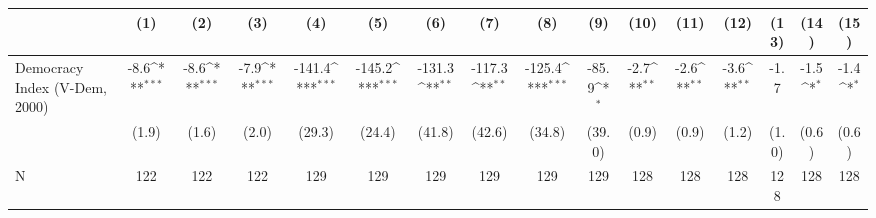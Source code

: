 {
\def\sym#1{\ifmmode^{#1}\else\(^{#1}\)\fi}
\begin{tabular}{l*{15}{c}}
\hline\hline
                    &\multicolumn{1}{c}{(1)}         &\multicolumn{1}{c}{(2)}         &\multicolumn{1}{c}{(3)}         &\multicolumn{1}{c}{(4)}         &\multicolumn{1}{c}{(5)}         &\multicolumn{1}{c}{(6)}         &\multicolumn{1}{c}{(7)}         &\multicolumn{1}{c}{(8)}         &\multicolumn{1}{c}{(9)}         &\multicolumn{1}{c}{(10)}         &\multicolumn{1}{c}{(11)}         &\multicolumn{1}{c}{(12)}         &\multicolumn{1}{c}{(13)}         &\multicolumn{1}{c}{(14)}         &\multicolumn{1}{c}{(15)}         \\
\hline
Democracy Index (V-Dem, 2000)&        -8.6\sym{***}&        -8.6\sym{***}&        -7.9\sym{***}&      -141.4\sym{***}&      -145.2\sym{***}&      -131.3\sym{**} &      -117.3\sym{**} &      -125.4\sym{***}&       -85.9\sym{*}  &        -2.7\sym{**} &        -2.6\sym{**} &        -3.6\sym{**} &        -1.7         &        -1.5\sym{*}  &        -1.4\sym{*}  \\
                    &       (1.9)         &       (1.6)         &       (2.0)         &      (29.3)         &      (24.4)         &      (41.8)         &      (42.6)         &      (34.8)         &      (39.0)         &       (0.9)         &       (0.9)         &       (1.2)         &       (1.0)         &       (0.6)         &       (0.6)         \\
\hline
N                   &         122         &         122         &         122         &         129         &         129         &         129         &         129         &         129         &         129         &         128         &         128         &         128         &         128         &         128         &         128         \\
\hline\hline
\end{tabular}
}
